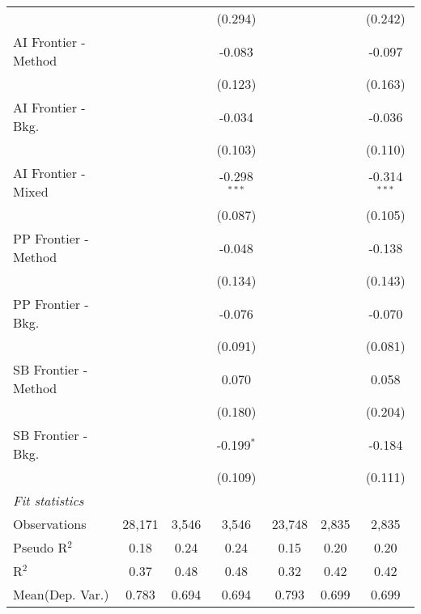 \begin{tabular}{lcccccc}
                        &               &               & (0.294)        &                &         & (0.242)\\   
   AI Frontier - Method &               &               & -0.083         &                &         & -0.097\\   
                        &               &               & (0.123)        &                &         & (0.163)\\   
   AI Frontier - Bkg.   &               &               & -0.034         &                &         & -0.036\\   
                        &               &               & (0.103)        &                &         & (0.110)\\   
   AI Frontier - Mixed  &               &               & -0.298$^{***}$ &                &         & -0.314$^{***}$\\   
                        &               &               & (0.087)        &                &         & (0.105)\\   
   PP Frontier - Method &               &               & -0.048         &                &         & -0.138\\   
                        &               &               & (0.134)        &                &         & (0.143)\\   
   PP Frontier - Bkg.   &               &               & -0.076         &                &         & -0.070\\   
                        &               &               & (0.091)        &                &         & (0.081)\\   
   SB Frontier - Method &               &               & 0.070          &                &         & 0.058\\   
                        &               &               & (0.180)        &                &         & (0.204)\\   
   SB Frontier - Bkg.   &               &               & -0.199$^{*}$   &                &         & -0.184\\   
                        &               &               & (0.109)        &                &         & (0.111)\\   
   \midrule
   \emph{Fit statistics}\\
   Observations         & 28,171        & 3,546         & 3,546          & 23,748         & 2,835   & 2,835\\  
   Pseudo R$^2$         & 0.18          & 0.24          & 0.24           & 0.15           & 0.20    & 0.20\\  
   R$^2$                & 0.37          & 0.48          & 0.48           & 0.32           & 0.42    & 0.42\\  
Mean(Dep. Var.) & 0.783 & 0.694 & 0.694 & 0.793 & 0.699 & 0.699 \\
   

\end{tabular}
